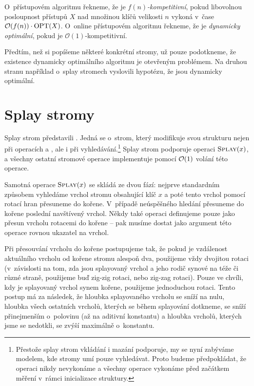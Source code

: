 \begin{definice}
O~přístupovém algoritmu řekneme, že je \emph{$f(n)$-kompetitivní}, pokud libovolnou
posloupnost přístupů $X$ nad množinou klíčů velikosti $n$ vykoná v~čase $
\mathcal O(f(n))\cdot\operatorname{OPT}(X)$. O~online přístupovém algoritmu řekneme, že je
\emph{dynamicky optimální}, pokud je $\mathcal O(1)$-kompetitivní.
\end{definice}

Předtím, než si popíšeme některé konkrétní stromy, už pouze podotkneme, že
existence dynamicky optimálního algoritmu je otevřeným problémem. Na druhou
stranu například o~splay stromech vyslovili \citet{splay} hypotézu, že jsou
dynamicky optimální.

\section{Splay stromy}

Splay strom představili \citet{splay}. Jedná se o~strom, který modifikuje svou
strukturu nejen při operacích  a , ale i při
vyhledávání.\footnote{Přestože splay strom vkládání i mazání podporuje, my se
nyní zabýváme modelem, kde stromy umí pouze vyhledávat. Proto budeme
předpokládat, že operaci  nikdy nevykonáme a všechny operace
 vykonáme před začátkem měření v~rámci inicializace struktury.}
Splay strom podporuje operaci $\ope{Splay}(x)$, a všechny ostatní stromové
operace implementuje pomocí $\mathcal O(1)$ volání této operace.

Samotná operace $\ope{Splay}(x)$ se skládá ze dvou fází: nejprve standardním způsobem
vyhledáme vrchol stromu obsahující klíč $x$ a poté tento vrchol pomocí rotací
hran přesuneme do kořene. V~případě neúspěšného hledání přesuneme do kořene poslední navštívený vrchol. Někdy také operaci  definujeme pouze jako přesun vrcholu rotacemi do kořene -- pak musíme dostat jako argument této operace rovnou ukazatel na vrchol.

Při přesouvání vrcholu do kořene postupujeme tak, že
pokud je vzdálenost aktuálního vrcholu od kořene stromu alespoň dva, použijeme
vždy dvojitou rotaci (v~závislosti na tom, zda jsou splayovaný vrchol a jeho
rodič synové na téže či různé straně, použijeme buď zig-zig rotaci, nebo zig-zag
rotaci). Pouze ve chvíli, kdy je splayovaný vrchol synem kořene, použijeme
jednoduchou rotaci. Tento postup má za následek, že hloubka splayovaného vrcholu se sníží na nulu, hloubka všech ostatních vrcholů, kterých se během splayování dotkneme, se sníží přinejmenším o~polovinu (až na aditivní konstantu) a hloubka vrcholů, kterých jsme se nedotkli, se zvýší maximálně o~konstantu.

